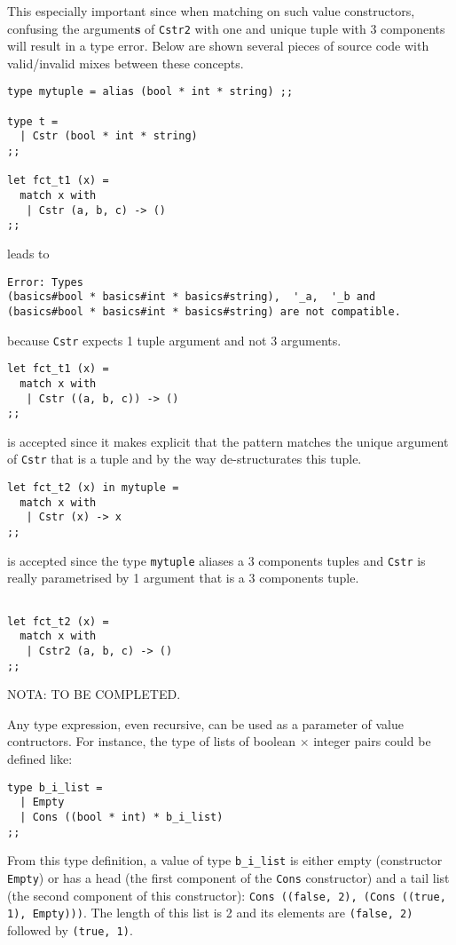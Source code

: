 \medskip
This especially important since when matching on such value
constructors, confusing the argument{\bf s} of {\tt Cstr2} with
one and unique tuple with 3 components will result in a type error.
Below are shown several pieces of source code with valid/invalid mixes
between these concepts.

{\scriptsize
\begin{lstlisting}
type mytuple = alias (bool * int * string) ;;

type t =
  | Cstr (bool * int * string)
;;

let fct_t1 (x) =
  match x with
   | Cstr (a, b, c) -> ()
;;
\end{lstlisting}
}
\noindent leads to
\begin{verbatim}
Error: Types
(basics#bool * basics#int * basics#string),  '_a,  '_b and
(basics#bool * basics#int * basics#string) are not compatible.
\end{verbatim}
\noindent because {\tt Cstr} expects 1 tuple argument and not 3
arguments.

\medskip
{\scriptsize
\begin{lstlisting}
let fct_t1 (x) =
  match x with
   | Cstr ((a, b, c)) -> ()
;;
\end{lstlisting}
}
\noindent is accepted since it makes explicit that the pattern matches
the unique argument of {\tt Cstr} that is a tuple and by the way
de-structurates this tuple.

\medskip
{\scriptsize
\begin{lstlisting}
let fct_t2 (x) in mytuple =
  match x with
   | Cstr (x) -> x
;;
\end{lstlisting}
}
\noindent is accepted since the type {\tt mytuple} aliases a 3
components tuples and {\tt Cstr} is really parametrised by 1 argument
that is a 3 components tuple.

{\scriptsize
\begin{lstlisting}

let fct_t2 (x) =
  match x with
   | Cstr2 (a, b, c) -> ()
;;
\end{lstlisting}
}

NOTA: TO BE COMPLETED.

Any type expression, even recursive, can be used as a  parameter of
value contructors.
For instance, the type of lists of boolean $\times$ integer pairs
could be defined like:

{\scriptsize
\begin{lstlisting}
type b_i_list =
  | Empty
  | Cons ((bool * int) * b_i_list)
;;
\end{lstlisting}
} From this type definition, a value of type {\tt b\_i\_list} is
either empty (constructor {\tt Empty}) or has a head (the first
component of the {\tt Cons} constructor) and a tail list (the
second component of this constructor): {\tt Cons ((false, 2), (Cons
  ((true, 1), Empty)))}. The length of this list is 2 and its
elements are {\tt (false, 2)} followed by {\tt (true, 1)}.

